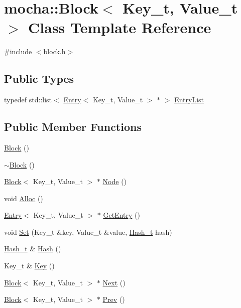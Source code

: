 \hypertarget{classmocha_1_1_block}{
\section{mocha::Block$<$ Key\_\-t, Value\_\-t $>$ Class Template Reference}
\label{classmocha_1_1_block}
}


{\ttfamily \#include $<$block.h$>$}

\subsection*{Public Types}
\begin{DoxyCompactItemize}
\item 
typedef std::list$<$ \hyperlink{classmocha_1_1_entry}{Entry}$<$ Key\_\-t, Value\_\-t $>$ $\ast$ $>$ \hyperlink{classmocha_1_1_block_a021e0317e479cd9af8dc345d382bf675}{EntryList}
\end{DoxyCompactItemize}
\subsection*{Public Member Functions}
\begin{DoxyCompactItemize}
\item 
\hyperlink{classmocha_1_1_block_a0bda8fe4ef62d71672a673a97ef13f05}{Block} ()
\item 
\hyperlink{classmocha_1_1_block_a8dc69c793ffe830490930759d8c7f4e8}{$\sim$Block} ()
\item 
\hyperlink{classmocha_1_1_block}{Block}$<$ Key\_\-t, Value\_\-t $>$ $\ast$ \hyperlink{classmocha_1_1_block_a6ad0be06026e4691b1bf402ebfcbd55b}{Node} ()
\item 
void \hyperlink{classmocha_1_1_block_a8f03eff4f3d7219a4011820c92ea820b}{Alloc} ()
\item 
\hyperlink{classmocha_1_1_entry}{Entry}$<$ Key\_\-t, Value\_\-t $>$ $\ast$ \hyperlink{classmocha_1_1_block_a6a8baf07b2b82f7276e19a8b73a5a552}{GetEntry} ()
\item 
void \hyperlink{classmocha_1_1_block_a560bb0b7c45e87b185b63ece5fb2c923}{Set} (Key\_\-t \&key, Value\_\-t \&value, \hyperlink{namespacemocha_ac43feb383f32d7a0b18fc5866cf9ed5c}{Hash\_\-t} hash)
\item 
\hyperlink{namespacemocha_ac43feb383f32d7a0b18fc5866cf9ed5c}{Hash\_\-t} \& \hyperlink{classmocha_1_1_block_a324597684fc027e5a4b427fbbfc37a47}{Hash} ()
\item 
Key\_\-t \& \hyperlink{classmocha_1_1_block_a1cf7a117e9f7d57060ee94d9ec5751ca}{Key} ()
\item 
\hyperlink{classmocha_1_1_block}{Block}$<$ Key\_\-t, Value\_\-t $>$ $\ast$ \hyperlink{classmocha_1_1_block_ad621221ad1bceb11fbaecc6d42051bd1}{Next} ()
\item 
\hyperlink{classmocha_1_1_block}{Block}$<$ Key\_\-t, Value\_\-t $>$ $\ast$ \hyperlink{classmocha_1_1_block_a366d0ff6d8947fa3e551eefcfa2d417c}{Prev} ()
\end{DoxyCompactItemize}

